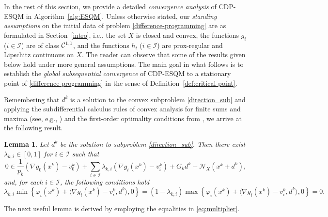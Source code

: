 \documentclass[11pt,a4paper]{article}
\newtheorem{lemma}[theorem]{Lemma}
\theoremstyle{plain}
\begin{document}
In the rest of this section, we provide a detailed {\em convergence analysis} of CDP-ESQM in Algorithm~\ref{alg:ESQM}. Unless otherwise stated, our {\em standing assumptions} on the initial data of problem \eqref{difference-programming} are as formulated in Section~\ref{intro}, i.e., the set $X$ is closed and convex, the functions $g_i$ ($i \in \mathcal{I}$) are of class ${\cal C}^{1,1}$, and the functions $h_i$ ($i \in \mathcal{I}$) are prox-regular and Lipschitz continuous on $X$. The reader can observe that some of the results given below hold under more general assumptions. The main goal in what follows is to establish the {\em global subsequential convergence} of CDP-ESQM to a stationary point of \eqref{difference-programming} in the sense of Definition~\ref{def:critical-point}.

Remembering that $d^k$ is a solution to the convex subproblem \eqref{direction_sub} and applying the subdifferential calculus rules of convex analysis for finite sums and maxima (see, e,g., \cite[Theorems~3.18, 3.27]{mordukhovich2023easy}) and the first-order optimality conditions from \cite[Theorem~7.15]{mordukhovich2023easy}, we arrive at the following result.




\begin{lemma}\label{lem:dk_foc}
Let $d^k$ be the solution to subproblem \eqref{direction_sub}. Then there {exist $\lambda_{k,i} \in [0,1]$ for $i \in \mathcal{I}$} such that
\begin{equation}\label{eq:foc} 
0 \in \frac{1}{p_k}\left(\nabla g_0(x^k)-v_0^k\right) + {\sum_{i\in\mathcal{I}} \lambda_{k,i} \left(\nabla g_i(x^k)-v_i^k\right)} + {G_k} d^k+\mathcal N_X \left(x^k+d^k\right), 
\end{equation}
and, for each $i\in\mathcal{I}$, the following conditions hold
\begin{equation}\label{eq:multiplier}
\lambda_{k,i} \min\left\{ \varphi_i(x^k) + \langle \nabla g_i(x^k) - v_i^k, d^k \rangle, 0 \right\}=(1- \lambda_{k,i})\max\left\{ \varphi_i(x^k) +  \langle \nabla g_i(x^k) - v_i^k, d^k \rangle, 0 \right\} =0.
\end{equation} 
\end{lemma}\vspace*{0.05in}

The next useful lemma is derived by employing the equalities in \eqref{eq:multiplier}.
\end{document}
